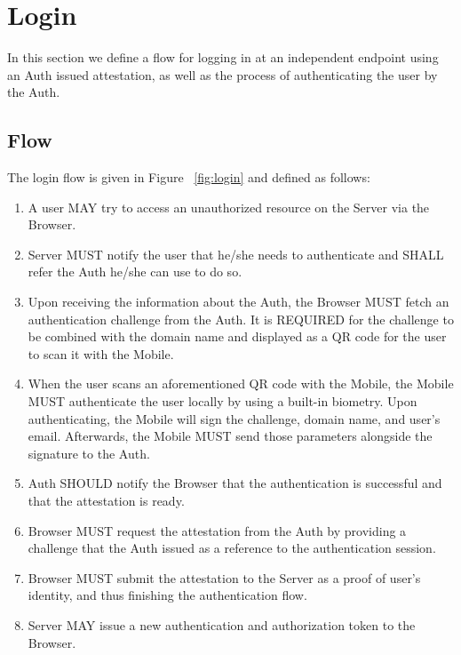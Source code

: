 \section{Login}
In this section we define a flow for logging in at an independent endpoint using an Auth
issued attestation, as well as the process of authenticating the user by the Auth. 

    \subsection{Flow}
    The login flow is given in Figure ~\ref{fig:login} and defined as follows:
        \begin{enumerate}
            \item A user MAY try to access an unauthorized resource on the Server via the Browser.
            \item Server MUST notify the user that he/she needs to authenticate and SHALL refer the Auth he/she 
                  can use to do so.
            \item Upon receiving the information about the Auth, the Browser MUST fetch an authentication challenge
                  from the Auth. It is REQUIRED for the challenge to be combined with the domain name and
                  displayed as a QR code for the user to scan it with the Mobile.
            \item When the user scans an aforementioned QR code with the Mobile, the Mobile MUST authenticate the 
                  user locally by using a built-in biometry. Upon authenticating, the Mobile will sign the 
                  challenge, domain name, and user's email. Afterwards, the Mobile MUST send those parameters 
                  alongside the signature to the Auth.
            \item Auth SHOULD notify the Browser that the authentication is successful and that the attestation is
                  ready.
            \item Browser MUST request the attestation from the Auth by providing a challenge that the Auth issued 
                  as a reference to the authentication session.
            \item Browser MUST submit the attestation to the Server as a proof of user's identity, and thus finishing 
                  the authentication flow.
            \item Server MAY issue a new authentication and authorization token to the Browser.
        \end{enumerate}

